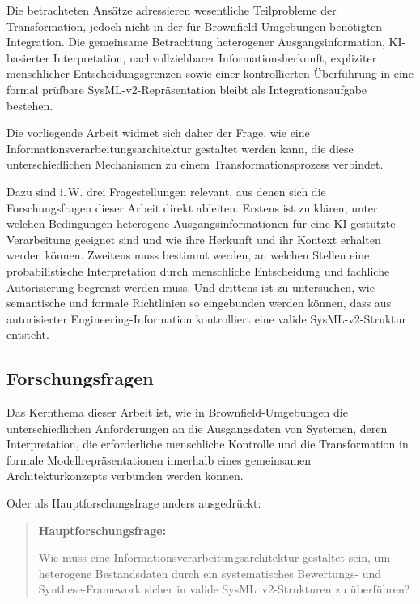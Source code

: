 Die betrachteten Ansätze adressieren wesentliche Teilprobleme der
Transformation, jedoch nicht in der für Brownfield-Umgebungen benötigten
Integration. Die gemeinsame Betrachtung heterogener Ausgangsinformation,
KI-basierter Interpretation, nachvollziehbarer Informationsherkunft,
expliziter menschlicher Entscheidungsgrenzen sowie einer kontrollierten
Überführung in eine formal prüfbare SysML-v2-Repräsentation bleibt als
Integrationsaufgabe bestehen.

Die vorliegende Arbeit widmet sich daher der Frage, wie eine
Informationsverarbeitungsarchitektur gestaltet werden kann, die diese
unterschiedlichen Mechanismen zu einem Transformationsprozess verbindet.

Dazu sind i.\,W. drei Fragestellungen relevant, aus denen sich die
Forschungsfragen dieser Arbeit direkt ableiten. Erstens ist zu klären, unter
welchen Bedingungen heterogene Ausgangsinformationen für eine KI-gestützte
Verarbeitung geeignet sind und wie ihre Herkunft und ihr Kontext erhalten
werden können. Zweitens muss bestimmt werden, an welchen Stellen eine
probabilistische Interpretation durch menschliche Entscheidung und fachliche
Autorisierung begrenzt werden muss. Und drittens ist zu untersuchen, wie
semantische und formale Richtlinien so eingebunden werden können, dass aus
autorisierter Engineering-Information kontrolliert eine valide
SysML-v2-Struktur entsteht.

\subsection{Forschungsfragen}
\label{sec:forschungsfragen}

Das Kernthema dieser Arbeit ist, wie in Brownfield-Umgebungen die
unterschiedlichen Anforderungen an die Ausgangsdaten von Systemen, deren
Interpretation, die erforderliche menschliche Kontrolle und die
Transformation in formale Modellrepräsentationen innerhalb eines gemeinsamen
Architekturkonzepts verbunden werden können.

Oder als Hauptforschungsfrage anders ausgedrückt:

\begin{quote}
\textbf{Hauptforschungsfrage:}

Wie muss eine Informationsverarbeitungsarchitektur gestaltet sein, um
heterogene Bestandsdaten durch ein systematisches Bewertungs- und
Synthese-Framework sicher in valide SysML~v2-Strukturen zu überführen?
\end{quote}

